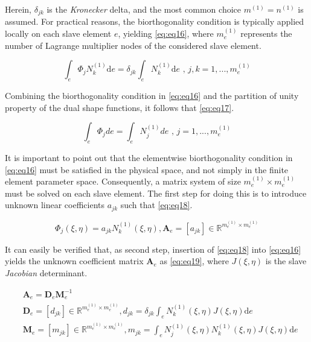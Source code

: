 \documentclass[a4paper,10pt]{article} %
\begin{document}
Herein, $\delta_{jk}$ is the \textit{Kronecker} delta, and the most common choice $m^{(1)} = n^{(1)}$ is assumed. For
practical reasons, the biorthogonality condition is typically applied locally on each slave element $e$, yielding \eqref{eq:eq16}, where $m_e^{(1)}$ represents the number of Lagrange multiplier nodes of the considered slave element.

\begin{equation}\label{eq:eq16}
 \int_{e}\Phi_j N_k^{(1)} \text{d}e = \delta_{jk} \int_{e} N_k^{(1)} \text{d}e \text{ , } j,k=1,...,m_e^{(1)}
\end{equation}

Combining the biorthogonality condition in \eqref{eq:eq16} and the partition of unity property of the dual shape functions, it follows that \eqref{eq:eq17}.

\begin{equation}\label{eq:eq17}
 \int_e \Phi_j de =  \int_e N_j^{(1)} de \text{ , } j=1,...,m_e^{(1)}
\end{equation}

It is important to point out that the elementwise biorthogonality condition in \eqref{eq:eq16} must be satisfied in the physical space, and not simply in the finite element parameter space. Consequently, a matrix system of size $m_e^{(1)} \times m_e^{(1)}$ must be solved on each slave element. The first step for doing this is to introduce unknown linear coefficients $a_{jk}$ such that \eqref{eq:eq18}.

\begin{equation}\label{eq:eq18}
 \Phi_j(\xi, \eta) = a_{jk} N_k^{(1)}\left(\xi, \eta \right), \mathbf{A}_e = [a_{jk}] \in \mathbb{R}^{m_e^{(1)} \times m_e^{(1)}}
 \end{equation}
 
 It can easily be verified that, as second step, insertion of \eqref{eq:eq18} into \eqref{eq:eq16} yields the unknown
coefficient matrix $\mathbf{A}_e$ as \eqref{eq:eq19}, where $J(\xi, \eta)$ is the slave \textit{Jacobian} determinant.

\begin{equation}\label{eq:eq19}
\begin{aligned}
 & \mathbf{A}_e = \mathbf{D}_e\mathbf{M}_e^{-1} \\
 & \mathbf{D}_e = [d_{jk}] \in \mathbb{R}^{m_e^{(1)} \times m_e^{(1)}}, d_{jk} = \delta_{jk} \int_e N_k^{(1)}(\xi, \eta) J(\xi, \eta) \text{d}e \\
 & \mathbf{M}_e = [m_{jk}] \in \mathbb{R}^{m_e^{(1)} \times m_e^{(1)}}, m_{jk} = \int_e N_j^{(1)}(\xi, \eta) N_k^{(1)}(\xi, \eta) J(\xi, \eta) \text{d}e
\end{aligned}
 \end{equation}
\end{document}
